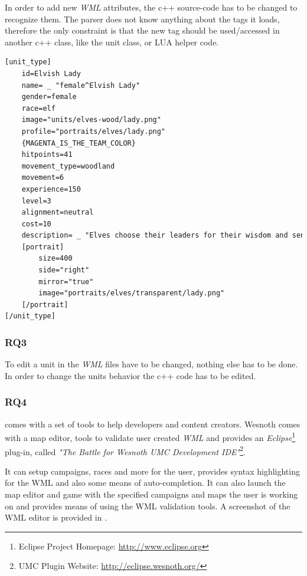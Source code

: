 In order to add new \textit{WML} attributes, the c++ source-code has to be changed to recognize them. The \BOW{} parser
does not know anything about the tags it loads, therefore the only constraint is that the new tag should be used/accessed
in another c++ class, like the unit class, or LUA helper code.

\begin{lstlisting}[language=XML,caption=A basic (shortened) \BOW{} unit definition in WML, label=wesnothwml]
[unit_type]
    id=Elvish Lady
    name= _ "female^Elvish Lady"
    gender=female
    race=elf
    image="units/elves-wood/lady.png"
    profile="portraits/elves/lady.png"
    {MAGENTA_IS_THE_TEAM_COLOR}
    hitpoints=41
    movement_type=woodland
    movement=6
    experience=150
    level=3
    alignment=neutral
    cost=10
    description= _ "Elves choose their leaders for their wisdom and sensitivity to the balance of universal forces; foresight is what has protected them in times of uncertainty. Their just reign is rewarded by the unflagging fealty of their people, which is the greatest gift for which any ruler could ask."
    [portrait]
        size=400
        side="right"
        mirror="true"
        image="portraits/elves/transparent/lady.png"
    [/portrait]
[/unit_type]
\end{lstlisting}

\subsubsection{RQ3}
To edit a unit in \BOW{} the \textit{WML} files have to be changed, nothing else has to be done. In order to change the
units behavior the c++ code has to be edited.

\subsubsection{RQ4}
\BOW{} comes with a set of tools to help developers and content creators. Wesnoth comes with a  map editor, tools to
validate user created \textit{WML} and provides an \textit{Eclipse}\footnote{Eclipse Project Homepage:
\url{http://www.eclipse.org}} plug-in, called \textit{"The Battle for Wesnoth UMC Development IDE"}\footnote{UMC Plugin
Website: \url{http://eclipse.wesnoth.org/}}.

It can setup
campaigns, races and more for the user, provides syntax highlighting for the WML and also some means of auto-completion. 
It can also launch the map editor and game with the specified campaigns and maps the user is working on and provides
means of using the WML validation tools. A screenshot of the WML editor is provided in .

